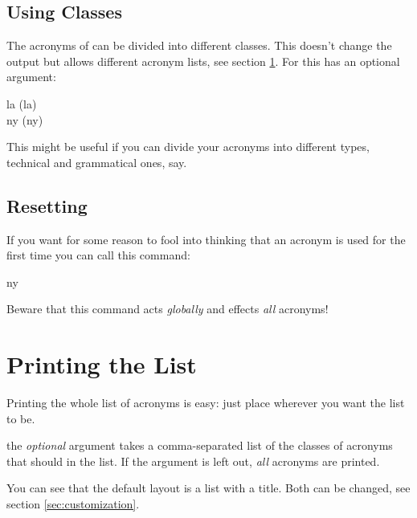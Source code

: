 \documentclass[DIV10,toc=index,toc=bib]{cnpkgdoc}
\begin{document}
\subsection{Using Classes}
The acronyms of \acro can be divided into different classes. This doesn't change
the output but allows different acronym lists, see section \ref{sec:print_lists}.
For this  has an optional argument:
\begin{beschreibung}
\end{beschreibung}
\begin{beispiel}
 \acl{la} (\acs{la}) \\
 \acl{ny} (\acs{ny})
\end{beispiel}
This might be useful if you can divide your acronyms into different types,
technical and grammatical ones, say.

\subsection{Resetting}
If you want for some reason to fool \acro into thinking that an acronym is used
for the first time you can call this command:
\begin{beschreibung}
\end{beschreibung}
\begin{beispiel}
 \acreset
 \ac{ny}
\end{beispiel}
Beware that this command acts \emph{globally} and effects \emph{all} acronyms!

\section{Printing the List}\label{sec:print_lists}
Printing the whole list of acronyms is easy: just place 
wherever you want the list to be.
\begin{beschreibung}
  the \emph{optional} argument takes a
 comma-separated list of the classes of acronyms that should in the list. If the
 argument is left out, \emph{all} acronyms are printed.
\end{beschreibung}
\begin{beispiel}[below]
 \printacronyms
\end{beispiel}
You can see that the default layout is a  list with a
 title. Both can be changed, see section \ref{sec:customization}.
\end{document}
